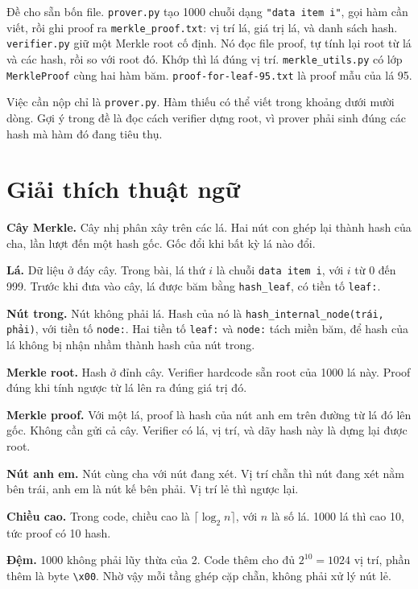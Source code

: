 \documentclass[12pt,a4paper]{article}
\begin{document}
Đề cho sẵn bốn file. \texttt{prover.py} tạo 1000 chuỗi dạng \texttt{"data item i"}, gọi hàm cần viết, rồi ghi proof ra \texttt{merkle\_proof.txt}: vị trí lá, giá trị lá, và danh sách hash. \texttt{verifier.py} giữ một Merkle root cố định. Nó đọc file proof, tự tính lại root từ lá và các hash, rồi so với root đó. Khớp thì lá đúng vị trí. \texttt{merkle\_utils.py} có lớp \texttt{MerkleProof} cùng hai hàm băm. \texttt{proof-for-leaf-95.txt} là proof mẫu của lá 95.

Việc cần nộp chỉ là \texttt{prover.py}. Hàm thiếu có thể viết trong khoảng dưới mười dòng. Gợi ý trong đề là đọc cách verifier dựng root, vì prover phải sinh đúng các hash mà hàm đó đang tiêu thụ.

\section{Giải thích thuật ngữ}

\textbf{Cây Merkle.}
Cây nhị phân xây trên các lá. Hai nút con ghép lại thành hash của cha, lần lượt đến một hash gốc. Gốc đổi khi bất kỳ lá nào đổi.

\textbf{Lá.}
Dữ liệu ở đáy cây. Trong bài, lá thứ \(i\) là chuỗi \texttt{data item i}, với \(i\) từ 0 đến 999. Trước khi đưa vào cây, lá được băm bằng \texttt{hash\_leaf}, có tiền tố \texttt{leaf:}.

\textbf{Nút trong.}
Nút không phải lá. Hash của nó là \texttt{hash\_internal\_node(trái, phải)}, với tiền tố \texttt{node:}. Hai tiền tố \texttt{leaf:} và \texttt{node:} tách miền băm, để hash của lá không bị nhận nhầm thành hash của nút trong.

\textbf{Merkle root.}
Hash ở đỉnh cây. Verifier hardcode sẵn root của 1000 lá này. Proof đúng khi tính ngược từ lá lên ra đúng giá trị đó.

\textbf{Merkle proof.}
Với một lá, proof là hash của nút anh em trên đường từ lá đó lên gốc. Không cần gửi cả cây. Verifier có lá, vị trí, và dãy hash này là dựng lại được root.

\textbf{Nút anh em.}
Nút cùng cha với nút đang xét. Vị trí chẵn thì nút đang xét nằm bên trái, anh em là nút kế bên phải. Vị trí lẻ thì ngược lại.

\textbf{Chiều cao.}
Trong code, chiều cao là \(\lceil \log_2 n \rceil\), với \(n\) là số lá. 1000 lá thì cao 10, tức proof có 10 hash.

\textbf{Đệm.}
1000 không phải lũy thừa của 2. Code thêm cho đủ \(2^{10} = 1024\) vị trí, phần thêm là byte \texttt{\textbackslash x00}. Nhờ vậy mỗi tầng ghép cặp chẵn, không phải xử lý nút lẻ.
\end{document}
